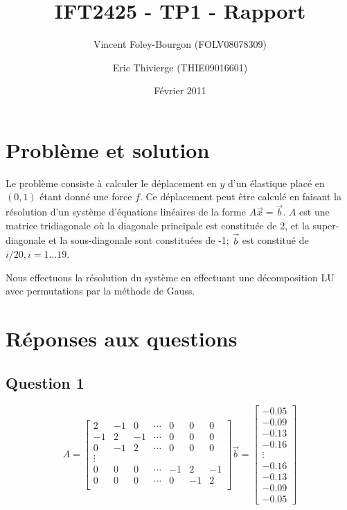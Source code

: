 \documentclass[10pt]{article}
\begin{document}
\title{IFT2425 - TP1 - Rapport}
\date{Février 2011}
\author{Vincent Foley-Bourgon (FOLV08078309) \and
  Eric Thivierge (THIE09016601)}

\maketitle

\section{Problème et solution}

Le problème consiste à calculer le déplacement en $y$ d'un élastique
placé en $(0,1)$ étant donné une force $f$.  Ce déplacement peut être
calculé en faisant la résolution d'un système d'équations linéaires
de la forme $A\vec{x} = \vec{b}$.  $A$ est une matrice tridiagonale où
la diagonale principale est constituée de 2, et la super-diagonale et
la sous-diagonale sont constituées de -1; $\vec{b}$ est constitué de
$i/20, i = 1 \ldots 19$.

Nous effectuons la résolution du système en effectuant une
décomposition LU avec permutations par la méthode de Gauss.

\section{Réponses aux questions}

\subsection{Question 1}

\[
A = \begin{bmatrix}
  2 & -1 & 0 & \cdots & 0 & 0 & 0 \\
  -1 & 2 & -1 & \cdots & 0 & 0 & 0 \\
  0 & -1 & 2 & \cdots & 0 & 0 & 0 \\
  \vdots \\
  0 & 0 & 0 & \cdots & -1 & 2 & -1 \\
  0 & 0 & 0 & \cdots & 0 & -1 & 2 \\
\end{bmatrix}
\vec{b} = \begin{bmatrix}
  -0.05 \\
  -0.09 \\
  -0.13 \\
  -0.16 \\
  \vdots\\
  -0.16 \\
  -0.13 \\
  -0.09 \\
  -0.05
\end{bmatrix}
\]
\end{document}

